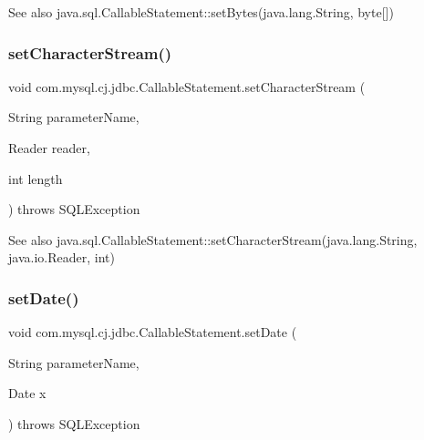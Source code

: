 \begin{DoxySeeAlso}{See also}
java.\+sql.\+Callable\+Statement\+::set\+Bytes(java.\+lang.\+String, byte\mbox{[}\mbox{]}) 
\end{DoxySeeAlso}
\mbox{\label{classcom_1_1mysql_1_1cj_1_1jdbc_1_1_callable_statement_ae67b3fc2ec48f545359e93d6568ccc3b}} 
\subsubsection{\texorpdfstring{set\+Character\+Stream()}{setCharacterStream()}}
{\footnotesize\ttfamily void com.\+mysql.\+cj.\+jdbc.\+Callable\+Statement.\+set\+Character\+Stream (\begin{DoxyParamCaption}\item[{String}]{parameter\+Name,  }\item[{Reader}]{reader,  }\item[{int}]{length }\end{DoxyParamCaption}) throws S\+Q\+L\+Exception}

\begin{DoxySeeAlso}{See also}
java.\+sql.\+Callable\+Statement\+::set\+Character\+Stream(java.\+lang.\+String, java.\+io.\+Reader, int) 
\end{DoxySeeAlso}
\mbox{\label{classcom_1_1mysql_1_1cj_1_1jdbc_1_1_callable_statement_ad8945fa51e3fbb56c41cea11624e726e}} 
\subsubsection{\texorpdfstring{set\+Date()}{setDate()}\hspace{0.1cm}{\footnotesize\ttfamily [1/2]}}
{\footnotesize\ttfamily void com.\+mysql.\+cj.\+jdbc.\+Callable\+Statement.\+set\+Date (\begin{DoxyParamCaption}\item[{String}]{parameter\+Name,  }\item[{Date}]{x }\end{DoxyParamCaption}) throws S\+Q\+L\+Exception}

